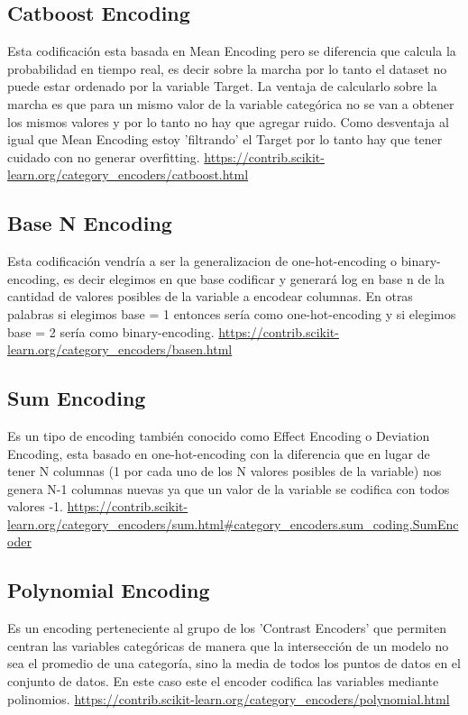 \documentclass[12pt,a4paper]{article}
\begin{document}
\subsection{Catboost Encoding}
Esta codificación esta basada en Mean Encoding pero se diferencia que calcula la probabilidad en tiempo real, es decir sobre la marcha por lo tanto el dataset no puede estar ordenado por la variable Target. La ventaja de calcularlo sobre la marcha es que para un mismo valor de la variable categórica no se van a obtener los mismos valores y por lo tanto no hay que agregar ruido. Como desventaja al igual que Mean Encoding estoy 'filtrando' el Target por lo tanto hay que tener cuidado con no generar overfitting.
\url{https://contrib.scikit-learn.org/category_encoders/catboost.html}

\subsection{Base N Encoding}
Esta codificación vendría a ser la generalizacion de one-hot-encoding o binary-encoding, es decir elegimos en que base codificar y generará log en base n de la cantidad de valores posibles de la variable a encodear columnas. En otras palabras si elegimos base = 1 entonces sería como one-hot-encoding y si elegimos base = 2 sería como binary-encoding.
\url{https://contrib.scikit-learn.org/category_encoders/basen.html}

\subsection{Sum Encoding}
Es un tipo de encoding también conocido como Effect Encoding o Deviation Encoding, esta basado en one-hot-encoding con la diferencia que en lugar de tener N columnas (1 por cada uno de los N valores posibles de la variable) nos genera N-1 columnas nuevas ya que un valor de la variable se codifica con todos valores -1.
\url{https://contrib.scikit-learn.org/category_encoders/sum.html#category_encoders.sum_coding.SumEncoder}

\subsection{Polynomial Encoding}
Es un encoding perteneciente al grupo de los 'Contrast Encoders' que permiten centran las variables categóricas de manera que la intersección de un modelo no sea el promedio de una categoría, sino la media de todos los puntos de datos en el conjunto de datos.
En este caso este el encoder codifica las variables mediante polinomios. 
\url{https://contrib.scikit-learn.org/category_encoders/polynomial.html}
\newpage
\end{document}
